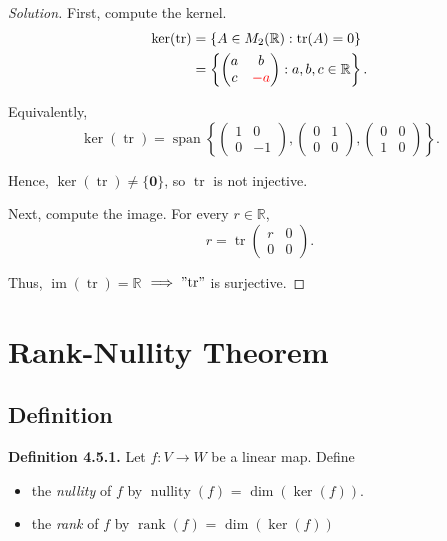 \documentclass[12pt]{article}
\newenvironment{solution}
{\begin{proof}[Solution]}
{\end{proof}}
\begin{document}
\begin{solution}
First, compute the kernel.
\[
\begin{aligned}
\operatorname{ker}(\operatorname{tr})
&=
\left\{
A\in M_2(\mathbb{R}):\operatorname{tr}(A)=0
\right\}\\
&=
\left\{
\begin{pmatrix}
a&b\\
c&\textcolor{red}{-a}
\end{pmatrix}
:
a,b,c\in\mathbb{R}
\right\}.
\end{aligned}
\]

Equivalently,
\[
\operatorname{ker}(\operatorname{tr})=\operatorname{span}
\left\{
\begin{pmatrix}
1&0\\
0&-1
\end{pmatrix},
\begin{pmatrix}
0&1\\
0&0
\end{pmatrix},
\begin{pmatrix}
0&0\\
1&0
\end{pmatrix}
\right\}.
\]

Hence, $\operatorname{ker}(\operatorname{tr})\neq\{\mathbf{0}\}$, so $\operatorname{tr}$ is not injective.

Next, compute the image. For every $r\in\mathbb{R}$,
\[
r=\operatorname{tr}
\begin{pmatrix}
r&0\\
0&0
\end{pmatrix}.
\]

Thus, $\operatorname{im}(\operatorname{tr})=\mathbb{R}$ $\implies\operatorname{"tr"}$ is surjective.

\end{solution}

\section{Rank-Nullity Theorem}

\subsection{Definition}

\textbf{Definition 4.5.1.}
Let $f: V \rightarrow W$ be a linear map. Define
\begin{itemize}
    \item[1.] the \emph{nullity} of $f$ by $\operatorname{nullity}(f)$ = $\operatorname{dim}(\operatorname{ker}(f))$.
    \item[2.] the \emph{rank} of $f$ by $\operatorname{rank}(f)$ = $\operatorname{dim}(\operatorname{ker}(f))$
\end{itemize}
\end{document}
